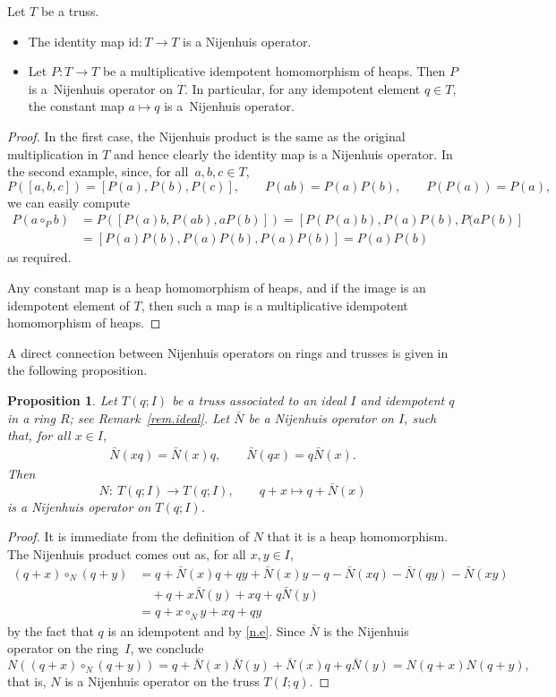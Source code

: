 \documentclass[10pt,a4paper]{amsart}
\numberwithin{equation}{section}
\newtheorem{Proposition}[Theorem]{Proposition}
 { \theoremstyle{definition}
\newtheorem{Definition}[Theorem]{Definition}
\newtheorem{Note}[Theorem]{Note}
\newtheorem{Example}[Theorem]{Example}
\newtheorem{Remark}[Theorem]{Remark}}
\newcommand{\id}{\mathrm{id}}
\begin{document}
\begin{Example}\label{ex.id.proj}
 Let $T$ be a truss.
 \begin{itemize}\itemsep=0pt
 \item[(1)] The identity map $\id\colon T\to T$ is a Nijenhuis operator.
 \item[(2)] Let $P\colon T\to T$ be a multiplicative idempotent homomorphism of heaps. Then $P$ is a~Nijenhuis operator on $T$. In particular, for any idempotent element $q\in T$, the constant map $a\mapsto q$ is a~Nijenhuis operator.
 \end{itemize}
\end{Example}
\begin{proof}
 In the first case, the Nijenhuis product is the same as the original multiplication in $T$ and hence clearly the identity map is a Nijenhuis operator. In the second example, since, for all~$a,b,c\in T$,
 \[
 P([a,b,c]) = [P(a), P(b), P(c)], \qquad P(ab) = P(a)P(b), \qquad P(P(a)) =P(a),
 \]
 we can easily compute
 \begin{align*}
 P(a\circ_Pb) &= P([P(a)b, P(ab),aP(b)]) = [P(P(a)b), P(a)P(b),P(aP(b)]\\
 &= [P(a)P(b), P(a)P(b),P(a)P(b)] = P(a)P(b)
 \end{align*}
 as required.

 Any constant map is a heap homomorphism of heaps, and if the image is an idempotent element of $T$, then such a map is a multiplicative idempotent homomorphism of heaps.
\end{proof}

A direct connection between Nijenhuis operators on rings and trusses is given in the following proposition.
\begin{Proposition}\label{prop.Nij.ideal}
 Let $T(q;I)$ be a truss associated to an ideal $I$ and idempotent $q$ in a ring $R$; see Remark~{\rm \ref{rem.ideal}}. Let $\bar{N}$ be a Nijenhuis operator on $I$, such that, for all $x\in I$,
 \begin{gather}\label{n.e}
 \bar{N}(xq) = \bar{N}(x)q, \qquad \bar{N}(qx) =q\bar{N}(x).
 \end{gather}
 Then
 \[
 N\colon\ T(q;I)\to T(q;I), \qquad q+x\mapsto q+ \bar{N}(x)
 \]
 is a Nijenhuis operator on $T(q;I)$.
\end{Proposition}
\begin{proof}
 It is immediate from the definition of $N$ that it is a heap homomorphism. The Nijenhuis product comes out as, for all $x,y\in I$,
 \begin{align*}
 (q+x)\circ_N(q+y) &= q +\bar{N}(x)q + qy +\bar{N}(x)y - q - \bar{N}(xq) - \bar{N}(qy) - \bar{N}(xy)\\
 & \quad+ q + x \bar{N}(y) + xq +q \bar{N}(y)\\
 &= q + x\circ_{\bar{N}}y +xq +qy
 \end{align*}
 by the fact that $q$ is an idempotent and by \eqref{n.e}. Since $\bar{N}$ is the Nijenhuis operator on the ring~$I$, we conclude
 \[
 N\left((q+x)\circ_N(q+y)\right) = q + \bar{N}(x)\bar{N}(y) + \bar{N}(x)q + q\bar{N}(y) = N(q+x)N(q+y),
 \]
that is, $N$ is a Nijenhuis operator on the truss $T(I;q)$.
\end{proof}
\end{document}
